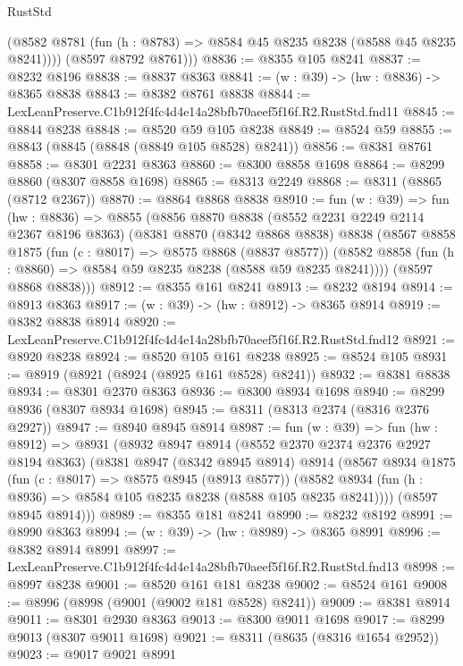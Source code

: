 \begin{lexlean}{RustStd}
\begin{coremodule}
          (@8582 @8781 (fun (h : @8783) => @8584 @45 @8235 @8238 (@8588 @45 @8235 @8241))))
        (@8597 @8792 @8761)))
@8836 := @8355 @105 @8241
@8837 := @8232 @8196
@8838 := @8837 @8363
@8841 := (w : @39) -> (hw : @8836) -> @8365 @8838
@8843 := @8382 @8761 @8838
@8844 := LexLeanPreserve.C1b912f4fc4d4e14a28bfb70aeef5f16f.R2.RustStd.fnd11
@8845 := @8844 @8238
@8848 := @8520 @59 @105 @8238
@8849 := @8524 @59
@8855 := @8843 (@8845 (@8848 (@8849 @105 @8528) @8241))
@8856 := @8381 @8761
@8858 := @8301 @2231 @8363
@8860 := @8300 @8858 @1698
@8864 := @8299 @8860 (@8307 @8858 @1698)
@8865 := @8313 @2249
@8868 := @8311 (@8865 (@8712 @2367))
@8870 := @8864 @8868 @8838
@8910 := fun (w : @39) =>
  fun (hw : @8836) =>
  @8855
    (@8856
      @8870
      @8838
      (@8552 @2231 @2249 @2114 @2367 @8196 @8363)
      (@8381
        @8870
        (@8342 @8868 @8838)
        @8838
        (@8567
          @8858
          @1875
          (fun (c : @8017) => @8575 @8868 (@8837 @8577))
          (@8582 @8858 (fun (h : @8860) => @8584 @59 @8235 @8238 (@8588 @59 @8235 @8241))))
        (@8597 @8868 @8838)))
@8912 := @8355 @161 @8241
@8913 := @8232 @8194
@8914 := @8913 @8363
@8917 := (w : @39) -> (hw : @8912) -> @8365 @8914
@8919 := @8382 @8838 @8914
@8920 := LexLeanPreserve.C1b912f4fc4d4e14a28bfb70aeef5f16f.R2.RustStd.fnd12
@8921 := @8920 @8238
@8924 := @8520 @105 @161 @8238
@8925 := @8524 @105
@8931 := @8919 (@8921 (@8924 (@8925 @161 @8528) @8241))
@8932 := @8381 @8838
@8934 := @8301 @2370 @8363
@8936 := @8300 @8934 @1698
@8940 := @8299 @8936 (@8307 @8934 @1698)
@8945 := @8311 (@8313 @2374 (@8316 @2376 @2927))
@8947 := @8940 @8945 @8914
@8987 := fun (w : @39) =>
  fun (hw : @8912) =>
  @8931
    (@8932
      @8947
      @8914
      (@8552 @2370 @2374 @2376 @2927 @8194 @8363)
      (@8381
        @8947
        (@8342 @8945 @8914)
        @8914
        (@8567
          @8934
          @1875
          (fun (c : @8017) => @8575 @8945 (@8913 @8577))
          (@8582 @8934 (fun (h : @8936) => @8584 @105 @8235 @8238 (@8588 @105 @8235 @8241))))
        (@8597 @8945 @8914)))
@8989 := @8355 @181 @8241
@8990 := @8232 @8192
@8991 := @8990 @8363
@8994 := (w : @39) -> (hw : @8989) -> @8365 @8991
@8996 := @8382 @8914 @8991
@8997 := LexLeanPreserve.C1b912f4fc4d4e14a28bfb70aeef5f16f.R2.RustStd.fnd13
@8998 := @8997 @8238
@9001 := @8520 @161 @181 @8238
@9002 := @8524 @161
@9008 := @8996 (@8998 (@9001 (@9002 @181 @8528) @8241))
@9009 := @8381 @8914
@9011 := @8301 @2930 @8363
@9013 := @8300 @9011 @1698
@9017 := @8299 @9013 (@8307 @9011 @1698)
@9021 := @8311 (@8635 (@8316 @1654 @2952))
@9023 := @9017 @9021 @8991

\end{coremodule}
\end{lexlean}
